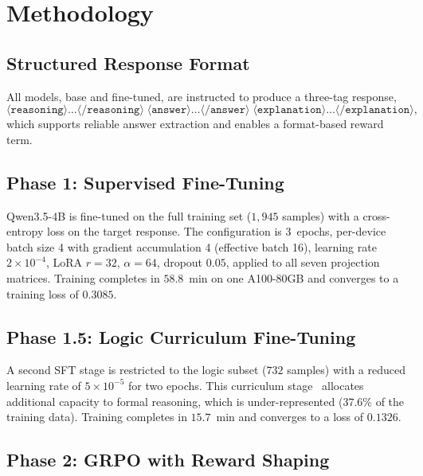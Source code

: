 \documentclass[preprint,12pt]{elsarticle}
\newcommand{\basemodelname}{Qwen3.5-4B}
\begin{document}
\section{Methodology}
\label{sec:method}

\subsection{Structured Response Format}
All models, base and fine-tuned, are instructed to produce a three-tag
response,
\begin{equation}
  \langle\texttt{reasoning}\rangle\ldots\langle/\texttt{reasoning}\rangle\;
  \langle\texttt{answer}\rangle\ldots\langle/\texttt{answer}\rangle\;
  \langle\texttt{explanation}\rangle\ldots\langle/\texttt{explanation}\rangle,
\end{equation}
which supports reliable answer extraction and enables a format-based reward
term.

\subsection{Phase 1: Supervised Fine-Tuning}
\basemodelname{} is fine-tuned on the full training set ($1{,}945$ samples)
with a cross-entropy loss on the target response. The configuration is
3~epochs, per-device batch size 4 with gradient accumulation 4 (effective
batch 16), learning rate $2\times10^{-4}$, LoRA $r=32$, $\alpha=64$, dropout
$0.05$, applied to all seven projection matrices. Training completes in
$58.8$~min on one A100-80GB and converges to a training loss of $0.3085$.

\subsection{Phase 1.5: Logic Curriculum Fine-Tuning}
A second SFT stage is restricted to the logic subset ($732$ samples) with a
reduced learning rate of $5\times10^{-5}$ for two epochs. This curriculum
stage~\cite{Bengio2009} allocates additional capacity to formal reasoning,
which is under-represented ($37.6\%$ of the training data). Training
completes in $15.7$~min and converges to a loss of $0.1326$.

\subsection{Phase 2: GRPO with Reward Shaping}
\end{document}
